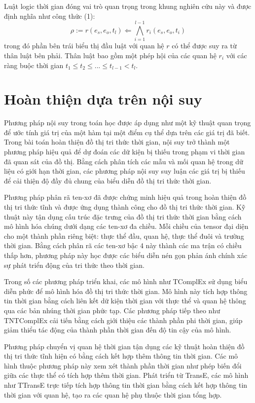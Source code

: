 Luật logic thời gian đóng vai trò quan trọng trong khung nghiên cứu này và được định nghĩa như công thức (1): 
\[
\rho := r(e_s, e_o, t_l) \Leftarrow \bigwedge_{i=1}^{l-1} r_i(e_s, e_o, t_i)
\]
trong đó phần bên trái biểu thị đầu luật với quan hệ \( r \) có thể được suy ra từ thân luật bên phải. Thân luật bao gồm một phép hội của các quan hệ \( r_i \) với các ràng buộc thời gian \( t_1 \leq t_2 \leq ... \leq t_{l-1} < t_l \).

\section{Hoàn thiện dựa trên nội suy}

Phương pháp nội suy trong toán học được áp dụng như một kỹ thuật quan trọng để ước tính giá trị của một hàm tại một điểm cụ thể dựa trên các giá trị đã biết. Trong bài toán hoàn thiện đồ thị tri thức thời gian, nội suy trở thành một phương pháp hiệu quả để dự đoán các dữ kiện bị thiếu trong phạm vi thời gian đã quan sát của đồ thị. Bằng cách phân tích các mẫu và mối quan hệ trong dữ liệu có giới hạn thời gian, các phương pháp nội suy suy luận các giá trị bị thiếu để cải thiện độ đầy đủ chung của biểu diễn đồ thị tri thức thời gian.

Phương pháp phân rã ten-xơ đã được chứng minh hiệu quả trong hoàn thiện đồ thị tri thức tĩnh và được ứng dụng thành công cho đồ thị tri thức thời gian. Kỹ thuật này tận dụng cấu trúc đặc trưng của đồ thị tri thức thời gian bằng cách mô hình hóa chúng dưới dạng các ten-xơ đa chiều. Mỗi chiều của tensor đại diện cho một thành phần riêng biệt: thực thể đầu, quan hệ, thực thể đuôi và trường thời gian. Bằng cách phân rã các ten-xơ bậc 4 này thành các ma trận có chiều thấp hơn, phương pháp này học được các biểu diễn nén gọn phản ánh chính xác sự phát triển động của tri thức theo thời gian.

Trong số các phương pháp triển khai, các mô hình như TComplEx sử dụng biểu diễn phức để mô hình hóa đồ thị tri thức thời gian. Mô hình này tích hợp thông tin thời gian bằng cách liên kết dữ kiện thời gian với thực thể và quan hệ thông qua các bản nhúng thời gian phức tạp. Các phương pháp tiếp theo như TNTComplEx cải tiến bằng cách giới thiệu các thành phần phi thời gian, giúp giảm thiểu tác động của thành phần thời gian đến độ tin cậy của mô hình.

Phương pháp chuyển vị quan hệ thời gian tận dụng các kỹ thuật hoàn thiện đồ thị tri thức tĩnh hiện có bằng cách kết hợp thêm thông tin thời gian. Các mô hình thuộc phương pháp này xem xét thành phần thời gian như phép biến đổi giữa các thực thể có tích hợp thêm thời gian. Phát triển từ TransE, các mô hình như TTransE trực tiếp tích hợp thông tin thời gian bằng cách kết hợp thông tin thời gian với quan hệ, tạo ra các quan hệ phụ thuộc thời gian tổng hợp.

